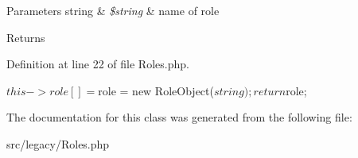\begin{DoxyParams}[1]{\-Parameters}
string & {\em \$string} & name of role\\
\hline
\end{DoxyParams}
\begin{DoxyReturn}{\-Returns}

\end{DoxyReturn}


\-Definition at line 22 of file \-Roles.\-php.


\begin{DoxyCode}
    {
        $this->role[] = $role = new RoleObject($string);

        return $role;
    }
\end{DoxyCode}


\-The documentation for this class was generated from the following file\-:\begin{DoxyCompactItemize}
\item 
src/legacy/\-Roles.\-php\end{DoxyCompactItemize}
